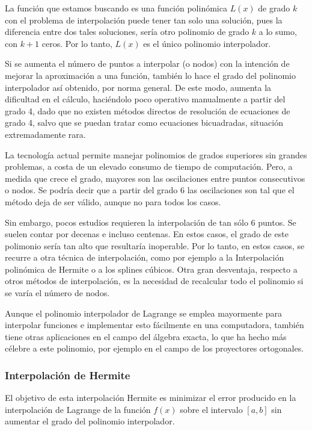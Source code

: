 \documentclass[
  12pt,
]{krantz}
\begin{document}
La función que estamos buscando es una función polinómica \(L(x)\) de grado \(k\) con el problema de interpolación puede tener tan solo una solución, pues la diferencia entre dos tales soluciones, sería otro polinomio de grado \(k\) a lo sumo, con \(k+1\) ceros. Por lo tanto, \(L(x)\) es el único polinomio interpolador.

Si se aumenta el número de puntos a interpolar (o nodos) con la intención de mejorar la aproximación a una función, también lo hace el grado del polinomio interpolador así obtenido, por norma general. De este modo, aumenta la dificultad en el cálculo, haciéndolo poco operativo manualmente a partir del grado 4, dado que no existen métodos directos de resolución de ecuaciones de grado 4, salvo que se puedan tratar como ecuaciones bicuadradas, situación extremadamente rara.

La tecnología actual permite manejar polinomios de grados superiores sin grandes problemas, a costa de un elevado consumo de tiempo de computación. Pero, a medida que crece el grado, mayores son las oscilaciones entre puntos consecutivos o nodos. Se podría decir que a partir del grado 6 las oscilaciones son tal que el método deja de ser válido, aunque no para todos los casos.

Sin embargo, pocos estudios requieren la interpolación de tan sólo 6 puntos. Se suelen contar por decenas e incluso centenas. En estos casos, el grado de este polimonio sería tan alto que resultaría inoperable. Por lo tanto, en estos casos, se recurre a otra técnica de interpolación, como por ejemplo a la Interpolación polinómica de Hermite o a los splines cúbicos. Otra gran desventaja, respecto a otros métodos de interpolación, es la necesidad de recalcular todo el polinomio si se varía el número de nodos.

Aunque el polinomio interpolador de Lagrange se emplea mayormente para interpolar funciones e implementar esto fácilmente en una computadora, también tiene otras aplicaciones en el campo del álgebra exacta, lo que ha hecho más célebre a este polinomio, por ejemplo en el campo de los proyectores ortogonales.

\hypertarget{interpolacion-de-hermite}{%
\subsubsection{Interpolación de Hermite}\label{interpolacion-de-hermite}}

El objetivo de esta interpolación Hermite es minimizar el error producido en la interpolación de Lagrange de la función \(f(x)\) sobre el intervalo \([a, b]\) sin aumentar el grado del polinomio interpolador.
\end{document}
